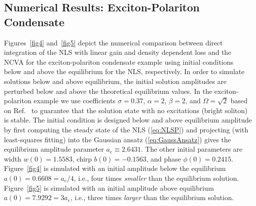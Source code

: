 {\subsection{Numerical Results: Exciton-Polariton Condensate}
%
Figures~\ref{fig4} and~\ref{fig5} depict the numerical comparison between direct integration of the NLS with linear gain and density dependent loss and the NCVA for the exciton-polariton condensate example using initial conditions below and above the equilibrium for the NLS, respectively.  In order to simulate solutions below and above equilibrium, the initial solution amplitudes are perturbed below and above the theoretical equilibrium values.  
%
In the exciton-polariton example we use coefficients $\sigma = 0.37$, $\alpha = 2$, $\beta = 2$, and $\Omega = \sqrt{2}$ based on Ref.~\cite{ref8} to guarantee that the solution state with no excitations (bright soliton) is stable.  The initial condition is designed below and above equilibrium amplitude by first computing the steady state of the NLS (\ref{eq:NLSP}) and projecting (with least-squares fitting) into the Gaussian ansatz (\ref{eq:GaussAnsatz}) gives the equilibrium amplitude parameter $a_e \equiv 2.6431$.  The other initial parameters are width $w(0)=1.5583$, chirp $b(0) = -0.1563$, and phase $\phi(0)=0.2415$.  Figure~\ref{fig4} is simulated with an initial amplitude below the equilibrium $a(0)= 0.6608 = a_e/4$, i.e., four times {\em smaller} than the equilibrium solution.   Figure~\ref{fig5} is simulated with an initial amplitude above equilibrium $a(0)= 7.9292 = 3 a_e$, i.e., three times {\em larger}  than the equilibrium solution.

}
